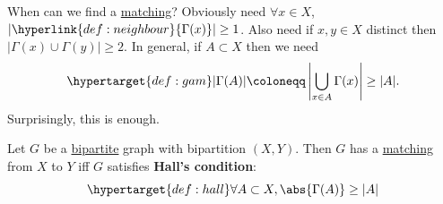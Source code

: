 \documentclass{article}
\begin{document}
When can we find a \hyperlink{def:matching}{matching}?
Obviously need $\forall x \in X$, $|\hyperlink{def:neighbour}{\Gamma(x)}| \geq 1$.
Also need if $x,y \in X$ distinct then $|\Gamma(x) \cup \Gamma(y)| \geq 2$.
In general, if $A \subset X$ then we need
\begin{equation*}
    \hypertarget{def:gam}|\Gamma(A)| \coloneqq \left|\bigcup_{x \in A} \Gamma(x)\right| \geq |A|.
\end{equation*}
Surprisingly, this is enough.
\begin{nthm}\label{thm:31}
    Let $G$ be a \hyperlink{def:bipartite}{bipartite} graph with bipartition $(X,Y)$.
    Then $G$ has a \hyperlink{def:matching}{matching} from $X$ to $Y$ iff $G$ satisfies \textbf{Hall's condition}:
    \begin{equation*}
        \hypertarget{def:hall}\forall A \subset X, \abs{\Gamma(A)} \geq |A|
    \end{equation*}
\end{nthm}
\end{document}

